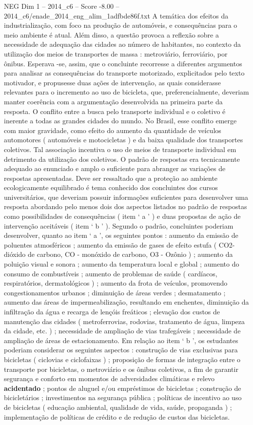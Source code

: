 \begin{textsample}{NEG Dim 1 – 2014\_c6 – Score -8.00 – 2014\_c6/enade\_2014\_eng\_alim\_1adfbde86f.txt}
A temática dos efeitos da industrialização, com foco na produção de automóveis, e consequências para o meio ambiente é atual.
Além disso, a questão provoca a reflexão sobre a necessidade de adequação das cidades ao número de habitantes, no contexto da utilização dos meios de transportes de massa : metroviário, ferroviário, por ônibus.
Esperava -se, assim, que o concluinte recorresse a diferentes argumentos para analisar as consequências do transporte motorizado, explicitados pelo texto motivador, e propusesse duas ações de intervenção, as quais considerasse relevantes para o incremento ao uso de bicicleta, que, preferencialmente, deveriam manter coerência com a argumentação desenvolvida na primeira parte da resposta.
O conflito entre a busca pelo transporte individual e o coletivo é inerente a todas as grandes cidades do mundo.
No Brasil, esse conflito emerge com maior gravidade, como efeito do aumento da quantidade de veículos automotores ( automóveis e motocicletas ) e da baixa qualidade dos transportes coletivos.
Tal associação incentiva o uso de meios de transporte individual em detrimento da utilização dos coletivos.
O padrão de respostas era tecnicamente adequado ao enunciado e amplo o suficiente para abranger as variações de respostas apresentadas.
Deve ser ressaltado que a proteção ao ambiente ecologicamente equilibrado é tema conhecido dos concluintes dos cursos universitários, que deveriam possuir informações suficientes para desenvolver uma resposta abordando pelo menos dois dos aspectos listados no padrão de respostas como possibilidades de consequências ( item ‘ a ’ ) e duas propostas de ação de intervenção aceitáveis ( item ‘ b ’ ).
Segundo o padrão, concluintes poderiam desenvolver, quanto ao item ‘ a ’, os seguintes pontos : aumento da emissão de poluentes atmosféricos ; aumento da emissão de gases de efeito estufa ( CO2- dióxido de carbono, CO - monóxido de carbono, O3 - Ozônio ) ; aumento da poluição visual e sonora ; aumento da temperatura local e global ; aumento do consumo de combustíveis ; aumento de problemas de saúde ( cardíacos, respiratórios, dermatológicos ) ; aumento da frota de veículos, promovendo congestionamentos urbanos ; diminuição de áreas verdes ; desmatamento ; aumento das áreas de impermeabilização, resultando em enchentes, diminuição da infiltração da água e recarga de lençóis freáticos ; elevação dos custos de manutenção das cidades ( metroferrovias, rodovias, tratamento de água, limpeza da cidade, etc. ) ; necessidade de ampliação de vias trafegáveis ; necessidade de ampliação de áreas de estacionamento.
Em relação ao item ‘ b ’, os estudantes poderiam considerar os seguintes aspectos : construção de vias exclusivas para bicicletas ( ciclovias e ciclofaixas ) ; proposição de formas de integração entre o transporte por bicicletas, o metroviário e os ônibus coletivos, a fim de garantir segurança e conforto em momentos de adversidades climáticas e relevo \textbf{acidentado} ; pontos de aluguel e/ou empréstimos de bicicletas ; construção de bicicletários ; investimentos na segurança pública ; políticas de incentivo ao uso de bicicletas ( educação ambiental, qualidade de vida, saúde, propaganda ) ; implementação de políticas de crédito e de redução de custos das bicicletas.

\end{textsample}
